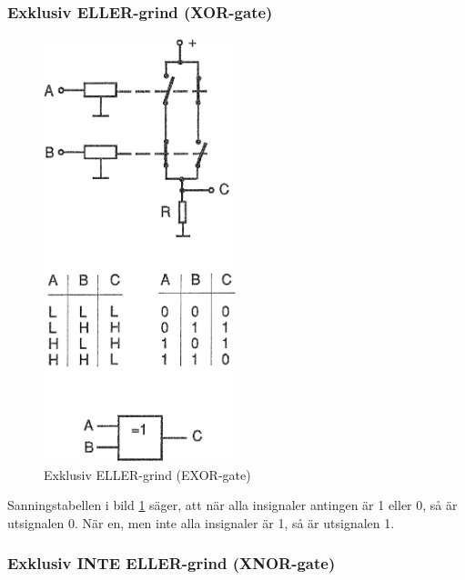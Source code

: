 \subsubsection{Exklusiv ELLER-grind (XOR-gate)}

\begin{figure}
\includegraphics[width=0.5\textwidth]{images/cropped_pdfs/bild_2_2-42.pdf}
\caption{Exklusiv ELLER-grind (EXOR-gate)}
\label{fig:BildII2-42}
\end{figure}

Sanningstabellen i bild \ref{fig:BildII2-42} säger, att när alla insignaler
antingen är 1 eller 0, så är utsignalen 0.
När en, men inte alla insignaler är 1, så är utsignalen 1.

\subsubsection{Exklusiv INTE ELLER-grind (XNOR-gate)}

